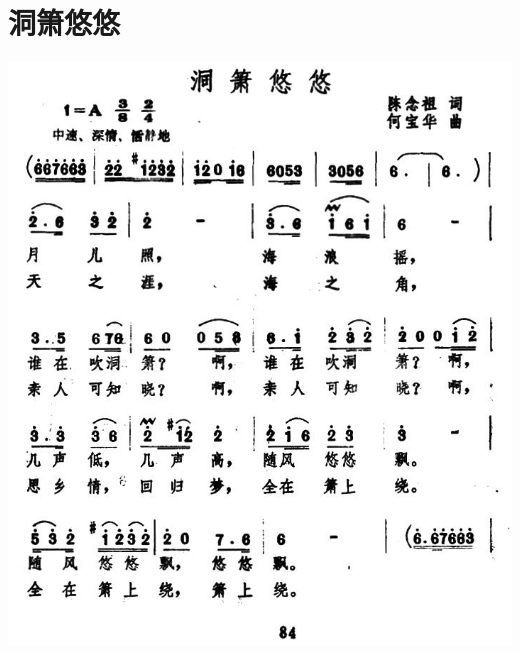 \documentclass[cn,pad,chinese,chinesefont=nofont]{elegantbook}
\begin{document}
\section{洞箫悠悠}
    \includegraphics[width=\textwidth]{dongxiao/洞箫悠悠.jpg}
\end{document}
